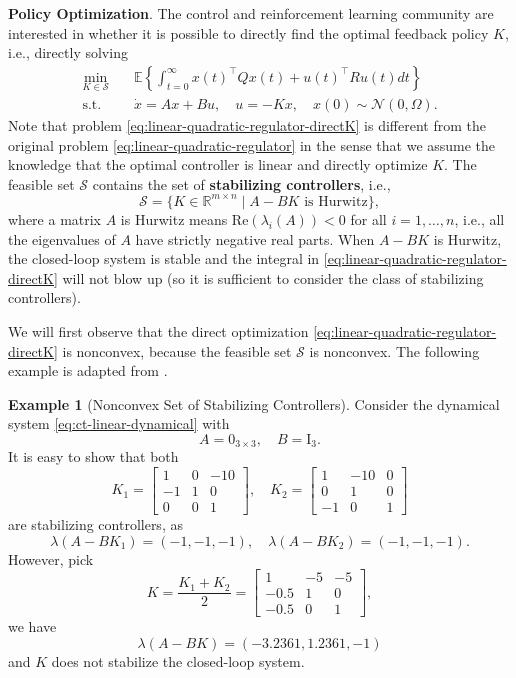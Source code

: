 \documentclass[
]{book}
\theoremstyle{definition}
\theoremstyle{definition}
\newtheorem{example}{Example}[chapter]
\theoremstyle{definition}
\theoremstyle{definition}
\theoremstyle{remark}
\begin{document}
\textbf{Policy Optimization}. The control and reinforcement learning community are interested in whether it is possible to directly find the optimal feedback policy \(K\), i.e., directly solving
\begin{equation}
\begin{split}
\min_{K \in \mathcal{S}}  & \quad \mathbb{E} \left\{  \int_{t=0}^{\infty} x(t)^\top Q x(t) + u(t)^\top R u(t) dt  \right\}  \\
\mathrm{s.t.}& \quad \dot{x} = A x + Bu, \quad u = -Kx, \quad x(0) \sim \mathcal{N}(0,\Omega).
\end{split}
\label{eq:linear-quadratic-regulator-directK}
\end{equation}
Note that problem \eqref{eq:linear-quadratic-regulator-directK} is different from the original problem \eqref{eq:linear-quadratic-regulator} in the sense that we assume the knowledge that the optimal controller is linear and directly optimize \(K\). The feasible set \(\mathcal{S}\) contains the set of \textbf{stabilizing controllers}, i.e.,
\begin{equation}
\mathcal{S}= \{ K \in \mathbb{R}^{m \times n} \mid A - BK \text{ is Hurwitz} \},
\label{eq:stabilizing-K}
\end{equation}
where a matrix \(A\) is Hurwitz means \(\mathrm{Re}(\lambda_i(A)) < 0\) for all \(i=1,\dots,n\), i.e., all the eigenvalues of \(A\) have strictly negative real parts. When \(A - BK\) is Hurwitz, the closed-loop system is stable and the integral in \eqref{eq:linear-quadratic-regulator-directK} will not blow up (so it is sufficient to consider the class of stabilizing controllers).

We will first observe that the direct optimization \eqref{eq:linear-quadratic-regulator-directK} is nonconvex, because the feasible set \(\mathcal{S}\) is nonconvex. The following example is adapted from \citep{fazel18icml-global}.

\begin{example}[Nonconvex Set of Stabilizing Controllers]
\protect\hypertarget{exm:NonconvexStabilizingController}{}\label{exm:NonconvexStabilizingController}Consider the dynamical system \eqref{eq:ct-linear-dynamical} with
\[
A = 0_{3 \times 3}, \quad B = \mathrm{I}_3.
\]
It is easy to show that both
\[
K_1 = \begin{bmatrix} 1 & 0 & -10 \\ -1 & 1 & 0 \\ 0 & 0 & 1 \end{bmatrix}, \quad K_2 = \begin{bmatrix} 1 & -10 & 0 \\ 0 & 1 & 0 \\ -1 & 0 & 1 \end{bmatrix}
\]
are stabilizing controllers, as
\[
\lambda(A - BK_1) = (-1,-1,-1), \quad \lambda(A - BK_2) = (-1,-1,-1).
\]
However, pick
\[
K = \frac{K_1 + K_2}{2} = \begin{bmatrix} 1 & -5 & -5 \\ -0.5 & 1 & 0 \\ -0.5 & 0 & 1 \end{bmatrix},
\]
we have
\[
\lambda(A - BK) = (-3.2361, 1.2361, -1)
\]
and \(K\) does not stabilize the closed-loop system.
\end{example}
\end{document}
